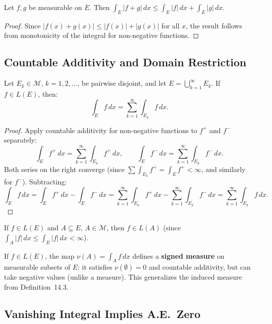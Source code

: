 \documentclass[11pt]{report}
\begin{document}
\begin{propbox}
Let $f, g$ be measurable on $E$. Then $\int_E |f + g|\,dx \leq \int_E |f|\,dx + \int_E |g|\,dx$.
\end{propbox}

\begin{proof}
Since $|f(x) + g(x)| \leq |f(x)| + |g(x)|$ for all $x$, the result follows from monotonicity of the integral for non-negative functions.
\end{proof}

\subsection{Countable Additivity and Domain Restriction}

\begin{thmbox}
Let $E_k \in \mathcal{M}$, $k = 1, 2, \ldots$, be pairwise disjoint, and let $E = \bigcup_{k=1}^{\infty} E_k$. If $f \in L(E)$, then:
\[
\int_E f\,dx = \sum_{k=1}^{\infty} \int_{E_k} f\,dx.
\]
\end{thmbox}

\begin{proof}
Apply countable additivity for non-negative functions to $f^+$ and $f^-$ separately:
\[
\int_E f^+\,dx = \sum_{k=1}^{\infty} \int_{E_k} f^+\,dx, \qquad \int_E f^-\,dx = \sum_{k=1}^{\infty} \int_{E_k} f^-\,dx.
\]
Both series on the right converge (since $\sum \int_{E_k} f^+ = \int_E f^+ < \infty$, and similarly for $f^-$). Subtracting:
\[
\int_E f\,dx = \int_E f^+\,dx - \int_E f^-\,dx = \sum_{k=1}^{\infty} \int_{E_k} f^+\,dx - \sum_{k=1}^{\infty} \int_{E_k} f^-\,dx = \sum_{k=1}^{\infty} \int_{E_k} f\,dx.
\]
\end{proof}

\begin{rembox}
If $f \in L(E)$ and $A \subseteq E$, $A \in \mathcal{M}$, then $f \in L(A)$ (since $\int_A |f|\,dx \leq \int_E |f|\,dx < \infty$).

If $f \in L(E)$, the map $\nu(A) = \int_A f\,dx$ defines a \textbf{signed measure} on measurable subsets of $E$: it satisfies $\nu(\emptyset) = 0$ and countable additivity, but can take negative values (unlike a measure). This generalizes the induced measure from Definition~14.3.
\end{rembox}

\subsection{Vanishing Integral Implies A.E.\ Zero}
\end{document}
